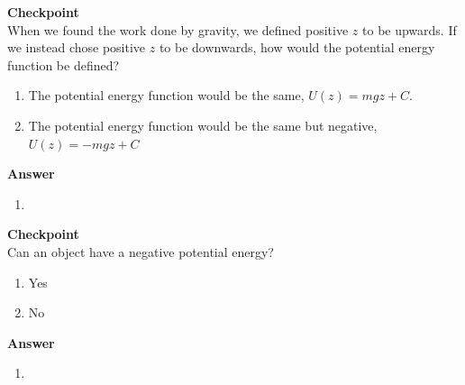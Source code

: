 \begin{framed}
\textbf{Checkpoint}\\
When we found the work done by gravity, we defined positive $z$ to be upwards. If we instead chose positive $z$ to be downwards, how would the potential energy function be defined?

\begin{enumerate}
\item The potential energy function would be the same, $U(z)=mgz+C$.
\item The potential energy function would be the same but negative, $U(z)= -mgz+C$
\end{enumerate}

\begin{framed}
\textbf{Answer}\\
\begin{enumerate}[resume]
\item
\end{enumerate}
\end{framed}
\end{framed}

\begin{framed}
\textbf{Checkpoint}\\
Can an object have a negative potential energy?

\begin{enumerate}
\item Yes
\item No
\end{enumerate}

\begin{framed}
\textbf{Answer}\\
\begin{enumerate}
\item
\end{enumerate}
\end{framed}
\end{framed}

